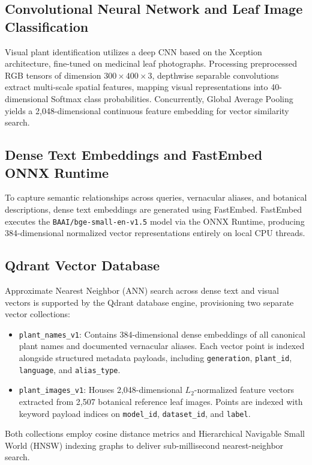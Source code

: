 \subsection{Convolutional Neural Network and Leaf Image Classification}

Visual plant identification utilizes a deep CNN based on the Xception architecture, fine-tuned on medicinal leaf photographs. Processing preprocessed RGB tensors of dimension $300 \times 400 \times 3$, depthwise separable convolutions extract multi-scale spatial features, mapping visual representations into 40-dimensional Softmax class probabilities. Concurrently, Global Average Pooling yields a 2,048-dimensional continuous feature embedding for vector similarity search.

\subsection{Dense Text Embeddings and FastEmbed ONNX Runtime}

To capture semantic relationships across queries, vernacular aliases, and botanical descriptions, dense text embeddings are generated using FastEmbed. FastEmbed executes the \texttt{BAAI/bge-small-en-v1.5} model via the ONNX Runtime, producing 384-dimensional normalized vector representations entirely on local CPU threads.

\subsection{Qdrant Vector Database}

Approximate Nearest Neighbor (ANN) search across dense text and visual vectors is supported by the Qdrant database engine, provisioning two separate vector collections:
\begin{itemize}
    \item \texttt{plant\_names\_v1}: Contains 384-dimensional dense embeddings of all canonical plant names and documented vernacular aliases. Each vector point is indexed alongside structured metadata payloads, including \texttt{generation}, \texttt{plant\_id}, \texttt{language}, and \texttt{alias\_type}.
    \item \texttt{plant\_images\_v1}: Houses 2,048-dimensional $L_2$-normalized feature vectors extracted from 2,507 botanical reference leaf images. Points are indexed with keyword payload indices on \texttt{model\_id}, \texttt{dataset\_id}, and \texttt{label}.
\end{itemize}
Both collections employ cosine distance metrics and Hierarchical Navigable Small World (HNSW) indexing graphs to deliver sub-millisecond nearest-neighbor search.

